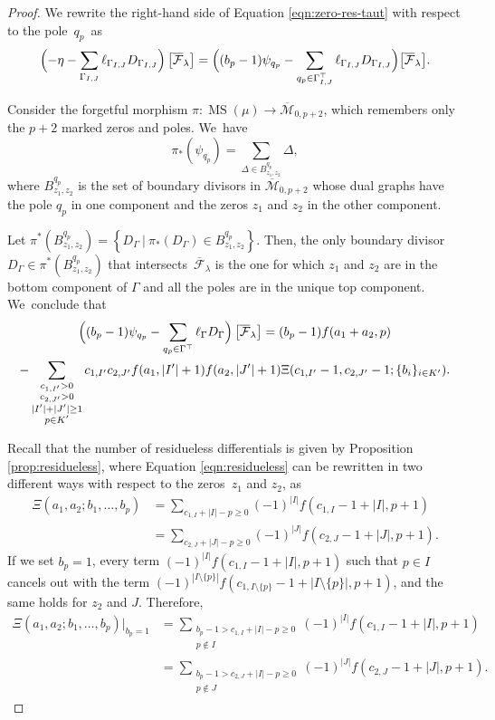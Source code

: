 \documentclass[11pt]{article}
\DeclareMathOperator\MS{MS}
\theoremstyle{definition}
\begin{document}
\begin{proof}
We rewrite the right-hand side of Equation \eqref{eqn:zero-res-taut} with respect to the pole~$q_p$~as
\begin{equation*}
\Bigl(-\eta-\sum_{\Gamma_{I,J}}\ell_{\Gamma_{I,J}} D_{\Gamma_{I,J}}\Bigr)\left[\overline{\mathcal{F}}_{\lambda}\right]=\Bigl((b_p-1)\psi_{q_p}-\sum_{q_p\in \Gamma_{I,J}^{\top}}\ell_{\Gamma_{I,J}}D_{\Gamma_{I,J}}\Bigr)\bigl[\overline{\mathcal{F}}_{\lambda}\bigr].
\end{equation*}

Consider the forgetful morphism $\pi\colon \MS(\mu)\to \overline{\mathcal M}_{0,p+2}$, which remembers only the $p+2$ marked zeros and poles. We~have
\[
\pi_{*}(\psi_{q_p})=\sum_{\Delta \in B^{q_p}_{z_1,z_2}}\Delta,
\]
where $B^{q_p}_{z_1,z_2}$ is the set of boundary divisors in $\overline{\mathcal M}_{0,p+2}$ whose dual graphs have the pole $q_p$ in one component and the zeros $z_1$ and $z_2$ in the other component.

Let $\pi^*(B^{q_p}_{z_1,z_2}) =\left\{D_{\Gamma}\ | \ \pi_{*}(D_{\Gamma})\in B^{q_p}_{z_1,z_2}\right\}$. Then, the only boundary divisor $D_{\Gamma}\in \pi^*(B^{q_p}_{z_1,z_2})$ that intersects~$\overline{\mathcal{F}}_{\lambda}$ is the one for which $z_1$ and $z_2$ are in the bottom component of $\Gamma$ and all the poles are in the unique top component. We~conclude that\vspace*{-5pt}
\begin{multline}
\Bigl((b_p-1)\psi_{q_p}-\sum_{q_p\in \Gamma^{\top}}\ell_{\Gamma}D_{\Gamma}\Bigr)\left[\overline{\mathcal{F}}_{\lambda}\right]
=(b_p-1)f(a_1+a_2,p) \\
-\sum_{\substack{c_{1,I'}>0 \\ c_{2,J'}>0 \\ |I'|+|J'|\geq 1 \\ p\in K'}}c_{1,I'}c_{2,J'}f(a_1,|I'|+1)f(a_2,|J'|+1)\Xi(c_{1,I'}-1,c_{2,J'}-1;\{b_i\}_{i\in K'}).
\end{multline}

Recall that the number of residueless differentials is given by Proposition \ref{prop:residueless}, where Equation \eqref{eqn:residueless} can be rewritten in two different ways with respect to the zeros~$z_1$ and $z_2$, as
\begin{align*}
\Xi(a_1,a_2;b_1,\ldots,b_p) & = \sum_{c_{1,I}+|I|-p\geq 0}(-1)^{|I|}f(c_{1,I}-1+|I|,p+1)\\
& = \sum_{c_{2,J}+|J|-p\geq 0}(-1)^{|J|}f(c_{2,J}-1+|J|,p+1).
\end{align*}
If we set $b_p=1$, every term $(-1)^{|I|}f(c_{1,I}-1+|I|,p+1)$ such that $p\in I$ cancels out with the term $(-1)^{|I\setminus\{p\}|}f(c_{1,I\setminus\{p\}}-1+|I\setminus\{p\}|,p+1)$, and the same holds for $z_2$ and $J$. Therefore,
\begin{align*}
\Xi(a_1,a_2;b_1,\ldots,b_p)|_{b_p=1} & = \sum_{\substack{b_p-1>c_{1,I}+|I|-p\geq 0\\ p\notin I}}(-1)^{|I|}f(c_{1,I}-1+|I|,p+1)\\
& = \sum_{\substack{b_p-1>c_{2,J}+|I|-p\geq 0\\ p\notin J}}(-1)^{|J|}f(c_{2,J}-1+|J|,p+1).
\end{align*}


\end{proof}
\end{document}
